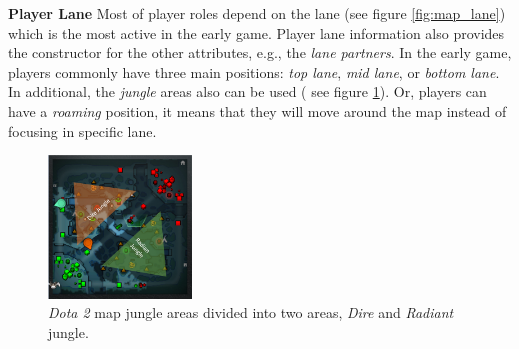 \textbf{Player Lane} Most of player roles depend on the lane (see figure \ref{fig:map_lane}) which is the most active in the early game. Player lane information also provides the constructor for the other attributes, e.g., the \textit{lane partners}. In the early game, players commonly have three main positions: \textit{top lane}, \textit{mid lane}, or \textit{bottom lane}. In additional, the \textit{jungle} areas also can be used ( see figure \ref{fig:map_jungle}). Or, players can have a \textit{roaming} position, it means that they will move around the map instead of focusing in specific lane.

\begin{figure}
\centering
\includegraphics[width=1.5in]{./figures/map_jungle.png}
\caption{\textit{Dota 2} map jungle areas divided into two areas, \textit{Dire} and \textit{Radiant} jungle.}
\label{fig:map_jungle}
\end{figure}

